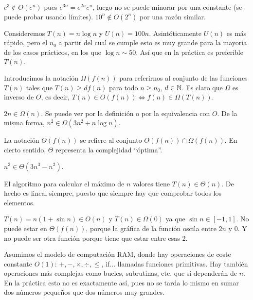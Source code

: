 \documentclass[AL.tex]{subfiles}
\begin{document}
\begin{ej}
$e^{3}\notin O (e^n)$ pues $e^{3n}=e^{2n}e^n$, luego no se puede minorar por una constante (se puede probar usando límites). $10^n\notin O(2^n)$ por una razón similar. 
\end{ej}

\begin{ej}
Consideremos $T(n)=n\log n$ y $U(n)=100n$. Asintóticamente $U(n)$ es más rápido, pero el $n_0$ a partir del cual se cumple esto es muy grande para la mayoría de los casos prácticos, en los que $\log n\sim 50$. Así que en la práctica es preferible $T(n)$.
\end{ej}

Introducimos la notación $\Omega(f(n))$ para referirnos al conjunto de las funciones $T(n)$ tales que $T(n)\geq df(n)$ para todo $n\geq n_0$, $d\in\mathbb{N}$. Es claro que $\Omega$ es inverso de $O$, es decir, $T(n)\in O(f(n))\Leftrightarrow f(n)\in\Omega(T(n))$.

\begin{ej}
$2n\in\Omega(n)$. Se puede ver por la definición o por la equivalencia con $O$. De la misma forma, $n^2\in\Omega(3n^2+n\log n)$. 
\end{ej}

La notación $\Theta(f(n))$ se refiere al conjunto $O(f(n))\cap\Omega(f(n))$. En cierto sentido, $\Theta$ representa la complejidad ``óptima''.

\begin{ej}
$n^3\in\Theta(3n^3-n^2)$. 
\end{ej}

\begin{ej}
El algoritmo para calcular el máximo de $n$ valores tiene $T(n)\in\Theta(n)$. De hecho es lineal siempre, puesto que siempre hay que comprobar todos los elementos. 
\end{ej}

\begin{ej}
$T(n)=n(1+\sin n)\in O(n)$ y $T(n)\in\Omega(0)$ ya que $\sin n\in [-1,1]$. No puede estar en $\Theta(f(n))$, porque la gráfica de la función oscila entre $2n$ y 0. Y no puede ser otra función porque tiene que estar entre esas 2. 
\end{ej}

\begin{nota}
Asumimos el modelo de computación RAM, donde hay operaciones de coste constante $O(1)$: $+,-,\times, \div, \leq$, if... llamadas funciones primitivas. Hay también operaciones más complejas como bucles, subrutinas, etc. que sí dependerán de $n$. En la práctica esto no es exactamente así, pues no se tarda lo mismo en sumar dos números pequeños que dos números muy grandes. 
\end{nota}
\end{document}
